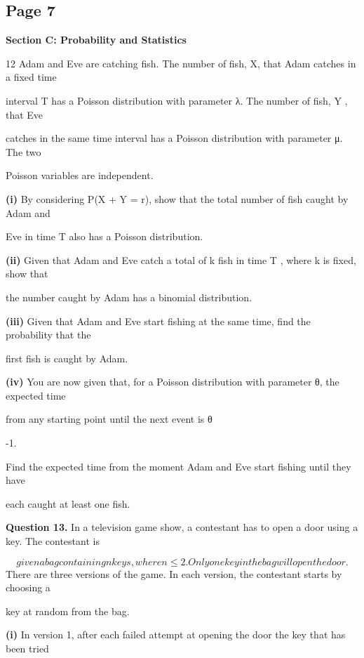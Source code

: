 \documentclass[12pt]{article}
\begin{document}
\subsection*{Page 7}
\begin{flushleft}
\bigskip\textbf{Section C: Probability and Statistics}\par
12 Adam and Eve are catching fish. The number of fish, X, that Adam catches in a fixed time\par
interval T has a Poisson distribution with parameter λ. The number of fish, Y , that Eve\par
catches in the same time interval has a Poisson distribution with parameter μ. The two\par
Poisson variables are independent.\par
\textbf{(i)} By considering P(X + Y = r), show that the total number of fish caught by Adam and\par
Eve in time T also has a Poisson distribution.\par
\textbf{(ii)} Given that Adam and Eve catch a total of k fish in time T , where k is fixed, show that\par
the number caught by Adam has a binomial distribution.\par
\textbf{(iii)} Given that Adam and Eve start fishing at the same time, find the probability that the\par
first fish is caught by Adam.\par
\textbf{(iv)} You are now given that, for a Poisson distribution with parameter θ, the expected time\par
from any starting point until the next event is θ\par
-1.\par
Find the expected time from the moment Adam and Eve start fishing until they have\par
each caught at least one fish.\par
\bigskip\textbf{Question 13.} In a television game show, a contestant has to open a door using a key. The contestant is\par
\[given a bag containing n keys, where n \leq 2. Only one key in the bag will open the door.\]
There are three versions of the game. In each version, the contestant starts by choosing a\par
key at random from the bag.\par
\textbf{(i)} In version 1, after each failed attempt at opening the door the key that has been tried\par

\end{flushleft}
\end{document}
